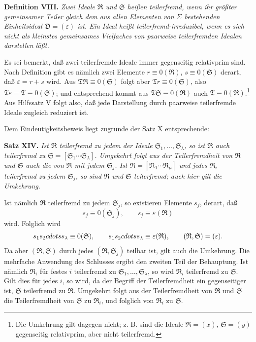 \documentclass[11pt]{article}
\newcommand{\ideal}[1]{\mathfrak{#1}}
\begin{document}
\textbf{Definition VIII.} \emph{Zwei Ideale $\ideal R$ und $\ideal S$ heißen teilerfremd, wenn ihr größter gemeinsamer Teiler gleich dem aus allen Elementen von $\Sigma$ bestehenden Einheitsideal $\ideal D=(\varepsilon)$ ist. Ein Ideal heißt teilerfremd-irreduzibel, wenn es sich nicht als kleinstes gemeinsames Vielfaches von paarweise teilerfremden Idealen darstellen läßt.}

Es sei bemerkt, daß zwei teilerfremde Ideale immer gegenseitig relativprim sind. Nach Definition gibt es nämlich zwei Elemente $r\equiv0(\ideal R)$, $s\equiv0(\ideal S)$ derart, daß $\varepsilon=r+s$ wird. Aus $\ideal T\ideal R\equiv0(\ideal S)$ folgt aber $\ideal T r\equiv0(\ideal S)$, also $\ideal T\varepsilon=\ideal T\equiv0(\ideal S)$; und entsprechend kommt aus $\ideal T\ideal S\equiv0(\ideal R)$ auch $\ideal T\equiv0(\ideal R)$.\footnote{Die Umkehrung gilt dagegen nicht; z. B. sind die Ideale $\ideal R=(x)$, $\ideal S=(y)$ gegenseitig relativprim, aber nicht teilerfremd.} Aus Hilfssatz V folgt also, daß jede Darstellung durch paarweise teilerfremde Ideale zugleich reduziert ist.

Dem Eindeutigkeitsbeweis liegt zugrunde der Satz X entsprechende:

\textbf{Satz XIV.} \emph{Ist $\ideal R$ teilerfremd zu jedem der Ideale $\ideal S_1,
\ldots,\ideal S_\lambda$, so ist $\ideal R$ auch teilerfremd zu $\ideal S=[\ideal S_1\cdots\ideal S_\lambda]$. Umgekehrt folgt aus der Teilerfremdheit von $\ideal R$ und $\ideal S$ auch die von $\ideal R$ mit jedem $\ideal S_j$. Ist $\ideal R=[\ideal R_1\cdots\ideal R_\mu]$ und jedes $\ideal R_i$ teilerfremd zu jedem $\ideal S_j$, so sind $\ideal R$ und $\ideal S$ teilerfremd; auch hier gilt die Umkehrung.}

Ist nämlich $\ideal R$ teilerfremd zu jedem $\ideal S_j$, so existieren Elemente $s_j$, derart, daß
\[
 s_j\equiv0(\ideal S_j),
 \qquad
 s_j\equiv\varepsilon(\ideal R)
\]
wird. Folglich wird
\[
 s_1s_2\\cdots s_\lambda\equiv0(\ideal S),
 \qquad
 s_1s_2\\cdots s_\lambda\equiv\varepsilon(\ideal R),
 \qquad
 (\ideal R,\ideal S)=(\varepsilon).
\]
Da aber $(\ideal R,\ideal S)$ durch jedes $(\ideal R,\ideal S_j)$ teilbar ist, gilt auch die Umkehrung. Die mehrfache Anwendung des Schlusses ergibt den zweiten Teil der Behauptung. Ist nämlich $\ideal R_i$ für festes $i$ teilerfremd zu $\ideal S_1,
\ldots,\ideal S_\lambda$, so wird $\ideal R_i$ teilerfremd zu $\ideal S$. Gilt dies für jedes $i$, so wird, da der Begriff der Teilerfremdheit ein gegenseitiger ist, $\ideal S$ teilerfremd zu $\ideal R$. Umgekehrt folgt aus der Teilerfremdheit von $\ideal R$ und $\ideal S$ die Teilerfremdheit von $\ideal S$ zu $\ideal R_i$, und folglich von $\ideal R_i$ zu $\ideal S$.
\end{document}
